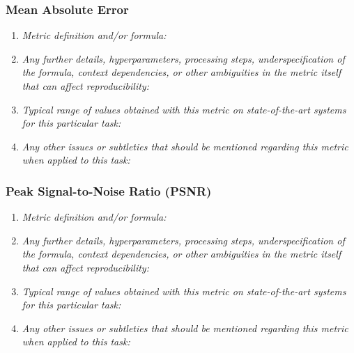 \documentclass[a4paper,11pt]{article}
\begin{document}
        \subsubsection{Mean Absolute Error}
            \begin{enumerate}[label=\alph*.]
                \item \textit{Metric definition and/or formula:}
                \bigskip
                \item \textit{Any further details, hyperparameters, processing steps, underspecification of the formula, context dependencies, or other ambiguities in the metric itself that can affect reproducibility:}
                \bigskip
                \item \textit{Typical range of values obtained with this metric on state-of-the-art systems for this particular task:}
                \bigskip
                \item \textit{Any other issues or subtleties that should be mentioned regarding this metric when applied to this task:}
                \bigskip
            \end{enumerate}
        \subsubsection{Peak Signal-to-Noise Ratio (PSNR)}
            \begin{enumerate}[label=\alph*.]
                \item \textit{Metric definition and/or formula:}
                \bigskip
                \item \textit{Any further details, hyperparameters, processing steps, underspecification of the formula, context dependencies, or other ambiguities in the metric itself that can affect reproducibility:}
                \bigskip
                \item \textit{Typical range of values obtained with this metric on state-of-the-art systems for this particular task:}
                \bigskip
                \item \textit{Any other issues or subtleties that should be mentioned regarding this metric when applied to this task:}
                \bigskip
            \end{enumerate}
\end{document}
